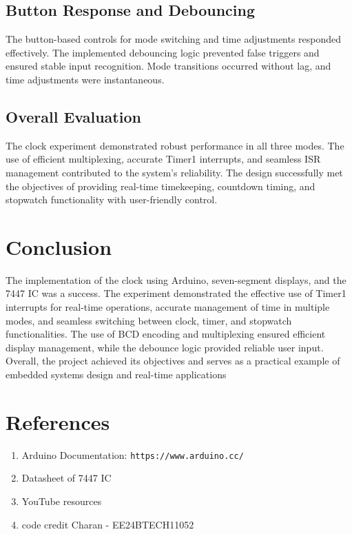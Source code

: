 \documentclass[journal]{IEEEtran}
\begin{document}
\subsection{Button Response and Debouncing}
The button-based controls for mode switching and time adjustments responded effectively. The implemented debouncing logic prevented false triggers and ensured stable input recognition. Mode transitions occurred without lag, and time adjustments were instantaneous.

\subsection{Overall Evaluation}
The clock experiment demonstrated robust performance in all three modes. The use of efficient multiplexing, accurate Timer1 interrupts, and seamless ISR management contributed to the system's reliability. The design successfully met the objectives of providing real-time timekeeping, countdown timing, and stopwatch functionality with user-friendly control.


\section{Conclusion}
The implementation of the clock using Arduino, seven-segment displays, and the 7447 IC was a success. The experiment demonstrated the effective use of Timer1 interrupts for real-time operations, accurate management of time in multiple modes, and seamless switching between clock, timer, and stopwatch functionalities. The use of BCD encoding and multiplexing ensured efficient display management, while the debounce logic provided reliable user input. Overall, the project achieved its objectives and serves as a practical example of embedded systems design and real-time applications

\section{References}
\begin{enumerate}
    \item Arduino Documentation: \texttt{https://www.arduino.cc/}
    \item Datasheet of 7447 IC
    \item YouTube resources
    \item code credit Charan - EE24BTECH11052
\end{enumerate}
\end{document}

